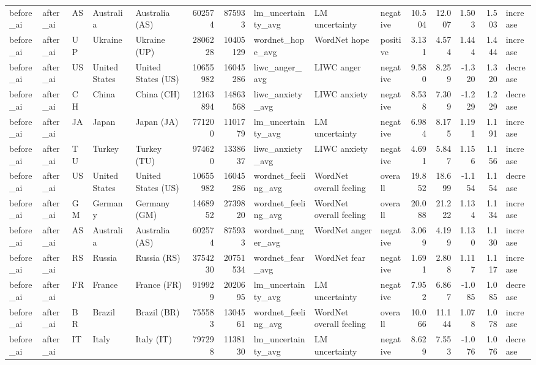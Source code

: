 \begin{tabular}{lllllrrlllrrrrl}
before\_ai & after\_ai & AS & Australia & Australia (AS) & 602574 & 875933 & lm\_uncertainty\_avg & LM uncertainty & negative & 10.504 & 12.007 & 1.503 & 1.503 & increase \\
before\_ai & after\_ai & UP & Ukraine & Ukraine (UP) & 2806228 & 10405129 & wordnet\_hope\_avg & WordNet hope & positive & 3.131 & 4.574 & 1.444 & 1.444 & increase \\
before\_ai & after\_ai & US & United States & United States (US) & 10655982 & 16045286 & liwc\_anger\_avg & LIWC anger & negative & 9.580 & 8.259 & -1.320 & 1.320 & decrease \\
before\_ai & after\_ai & CH & China & China (CH) & 12163894 & 14863568 & liwc\_anxiety\_avg & LIWC anxiety & negative & 8.538 & 7.309 & -1.229 & 1.229 & decrease \\
before\_ai & after\_ai & JA & Japan & Japan (JA) & 771200 & 1101779 & lm\_uncertainty\_avg & LM uncertainty & negative & 6.984 & 8.175 & 1.191 & 1.191 & increase \\
before\_ai & after\_ai & TU & Turkey & Turkey (TU) & 974620 & 1338637 & liwc\_anxiety\_avg & LIWC anxiety & negative & 4.691 & 5.847 & 1.156 & 1.156 & increase \\
before\_ai & after\_ai & US & United States & United States (US) & 10655982 & 16045286 & wordnet\_feeling\_avg & WordNet overall feeling & overall & 19.852 & 18.699 & -1.154 & 1.154 & decrease \\
before\_ai & after\_ai & GM & Germany & Germany (GM) & 1468952 & 2739820 & wordnet\_feeling\_avg & WordNet overall feeling & overall & 20.088 & 21.222 & 1.134 & 1.134 & increase \\
before\_ai & after\_ai & AS & Australia & Australia (AS) & 602574 & 875933 & wordnet\_anger\_avg & WordNet anger & negative & 3.069 & 4.199 & 1.130 & 1.130 & increase \\
before\_ai & after\_ai & RS & Russia & Russia (RS) & 3754230 & 20751534 & wordnet\_fear\_avg & WordNet fear & negative & 1.691 & 2.808 & 1.117 & 1.117 & increase \\
before\_ai & after\_ai & FR & France & France (FR) & 919929 & 2020695 & lm\_uncertainty\_avg & LM uncertainty & negative & 7.952 & 6.867 & -1.085 & 1.085 & decrease \\
before\_ai & after\_ai & BR & Brazil & Brazil (BR) & 755583 & 1304561 & wordnet\_feeling\_avg & WordNet overall feeling & overall & 10.066 & 11.144 & 1.078 & 1.078 & increase \\
before\_ai & after\_ai & IT & Italy & Italy (IT) & 797298 & 1138130 & lm\_uncertainty\_avg & LM uncertainty & negative & 8.629 & 7.553 & -1.076 & 1.076 & decrease \\

\end{tabular}
